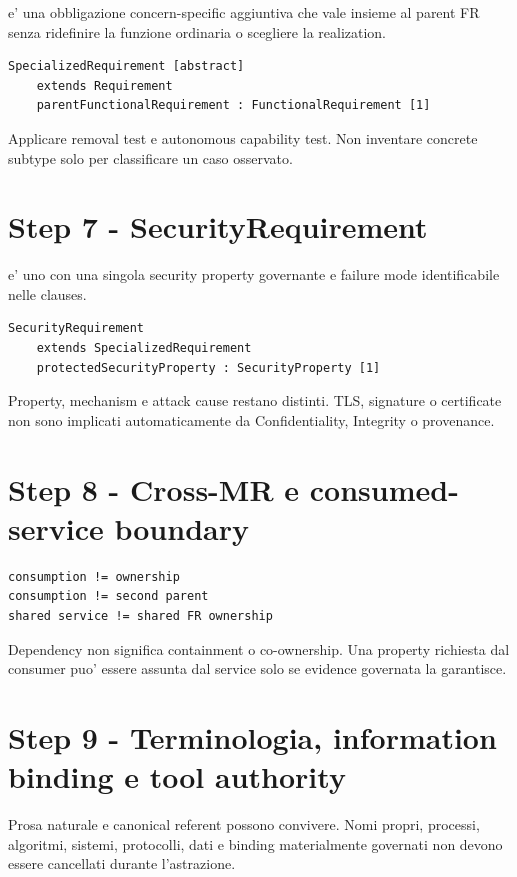 \documentclass[11pt,a4paper]{article}
\begin{document}
\SR{} e' una obbligazione concern-specific aggiuntiva che vale insieme al parent FR senza ridefinire la funzione ordinaria o scegliere la realization.

\begin{lstlisting}
SpecializedRequirement [abstract]
    extends Requirement
    parentFunctionalRequirement : FunctionalRequirement [1]
\end{lstlisting}

Applicare removal test e autonomous capability test. Non inventare concrete subtype solo per classificare un caso osservato.

\section{Step 7 - SecurityRequirement}
\closedtag

\SECR{} e' uno \SR{} con una singola security property governante e failure mode identificabile nelle clauses.

\begin{lstlisting}
SecurityRequirement
    extends SpecializedRequirement
    protectedSecurityProperty : SecurityProperty [1]
\end{lstlisting}

Property, mechanism e attack cause restano distinti. TLS, signature o certificate non sono implicati automaticamente da Confidentiality, Integrity o provenance.

\section{Step 8 - Cross-MR e consumed-service boundary}
\closedtag

\begin{lstlisting}
consumption != ownership
consumption != second parent
shared service != shared FR ownership
\end{lstlisting}

Dependency non significa containment o co-ownership. Una property richiesta dal consumer puo' essere assunta dal service solo se evidence governata la garantisce.

\section{Step 9 - Terminologia, information binding e tool authority}
\closedtag

Prosa naturale e canonical referent possono convivere. Nomi propri, processi, algoritmi, sistemi, protocolli, dati e binding materialmente governati non devono essere cancellati durante l'astrazione.
\end{document}
